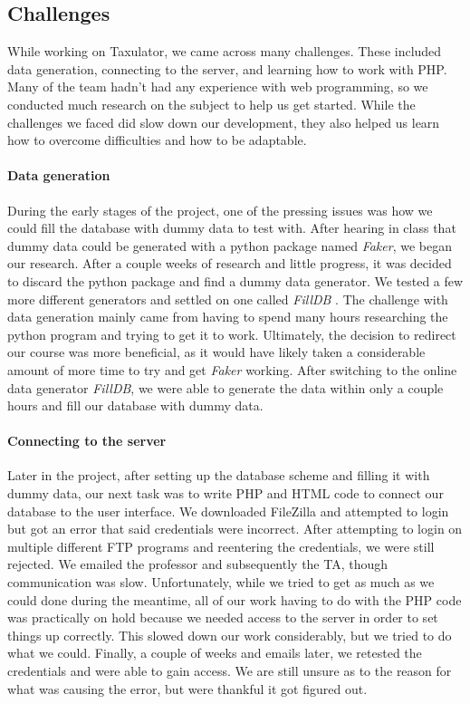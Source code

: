 \documentclass[sigconf]{acmart}
\begin{document}
\subsection{Challenges}
While working on Taxulator, we came across many challenges. These included data generation, connecting to the server, and learning how to work with PHP. Many of the team hadn't had any experience with web programming, so we conducted much research on the subject to help us get started. While the challenges we faced did slow down our development, they also helped us learn how to overcome difficulties and how to be adaptable.

\paragraph{Data generation}
During the early stages of the project, one of the pressing issues was how we could fill the database with dummy data to test with. After hearing in class that dummy data could be generated with a python package named \textit{Faker}, we began our research. After a couple weeks of research and little progress, it was decided to discard the python package and find a dummy data generator. We tested a few more different generators and settled on one called \textit{FillDB} \cite{FillDB}. The challenge with data generation mainly came from having to spend many hours researching the python program and trying to get it to work. Ultimately, the decision to redirect our course was more beneficial, as it would have likely taken a considerable amount of more time to try and get \textit{Faker} working. After switching to the online data generator \textit{FillDB}, we were able to generate the data within only a couple hours and fill our database with dummy data.

\paragraph{Connecting to the server}
Later in the project, after setting up the database scheme and filling it with dummy data, our next task was to write PHP and HTML code to connect our database to the user interface. We downloaded FileZilla and attempted to login but got an error that said credentials were incorrect. After attempting to login on multiple different FTP programs and reentering the credentials, we were still rejected. We emailed the professor and subsequently the TA, though communication was slow. Unfortunately, while we tried to get as much as we could done during the meantime, all of our work having to do with the PHP code was practically on hold because we needed access to the server in order to set things up correctly. This slowed down our work considerably, but we tried to do what we could. Finally, a couple of weeks and emails later, we retested the credentials and were able to gain access. We are still unsure as to the reason for what was causing the error, but were thankful it got figured out.
\end{document}

